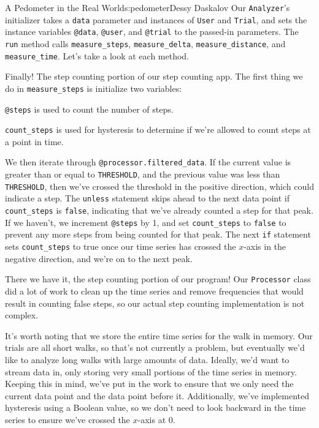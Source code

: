 \begin{aosachapter}{A Pedometer in the Real World}{s:pedometer}{Dessy Daskalov}
Our \texttt{Analyzer}'s initializer takes a \texttt{data} parameter and
instances of \texttt{User} and \texttt{Trial}, and sets the instance
variables \texttt{@data}, \texttt{@user}, and \texttt{@trial} to the
passed-in parameters. The \texttt{run} method calls
\texttt{measure\_steps}, \texttt{measure\_delta},
\texttt{measure\_distance}, and \texttt{measure\_time}. Let's take a
look at each method.

\label{measureux5fsteps}

Finally! The step counting portion of our step counting app. The first
thing we do in \texttt{measure\_steps} is initialize two variables:

\begin{aosaitemize}

\item
  \texttt{@steps} is used to count the number of steps.
\item
  \texttt{count\_steps} is used for hysteresis to determine if we're
  allowed to count steps at a point in time.
\end{aosaitemize}

We then iterate through \texttt{@processor.filtered\_data}. If the
current value is greater than or equal to \texttt{THRESHOLD}, and the
previous value was less than \texttt{THRESHOLD}, then we've crossed the
threshold in the positive direction, which could indicate a step. The
\texttt{unless} statement skips ahead to the next data point if
\texttt{count\_steps} is \texttt{false}, indicating that we've already
counted a step for that peak. If we haven't, we increment
\texttt{@steps} by 1, and set \texttt{count\_steps} to \texttt{false} to
prevent any more steps from being counted for that peak. The next
\texttt{if} statement sets \texttt{count\_steps} to true once our time
series has crossed the $x$-axis in the negative direction, and we're on
to the next peak.

There we have it, the step counting portion of our program! Our
\texttt{Processor} class did a lot of work to clean up the time series
and remove frequencies that would result in counting false steps, so our
actual step counting implementation is not complex.

It's worth noting that we store the entire time series for the walk in
memory. Our trials are all short walks, so that's not currently a
problem, but eventually we'd like to analyze long walks with large
amounts of data. Ideally, we'd want to stream data in, only storing very
small portions of the time series in memory. Keeping this in mind, we've
put in the work to ensure that we only need the current data point and
the data point before it. Additionally, we've implemented hysteresis
using a Boolean value, so we don't need to look backward in the time
series to ensure we've crossed the $x$-axis at 0.


\end{aosachapter}
